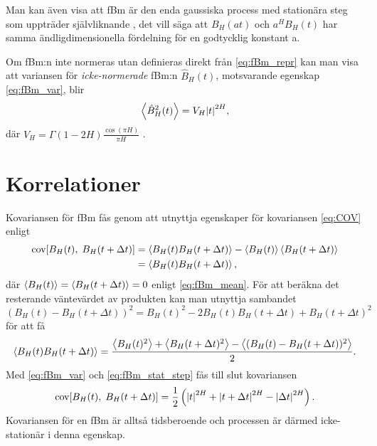 Man kan även visa att fBm är den enda gaussiska process med stationära steg som uppträder självliknande \cite{Dieker_fBm}, det vill säga att $B_H(at)$ och $a^H B_H(t)$ har samma ändligdimensionella fördelning för en godtycklig konstant a.

Om fBm:n inte normeras utan definieras direkt från \eqref{eq:fBm_repr} kan man visa att variansen för \emph{icke-normerade} fBm:n $\hat{B}_H(t)$, motsvarande egenskap \eqref{eq:fBm_var}, blir \cite{Dieker_fBm}
\begin{equation} \label{eq:fBm_onorm_var}
    \ev{\hat{B}^2_H(t)} = V_H \abs{t}^{2H},
\end{equation}
där $V_H = \Gamma(1-2H)\frac{\cos(\pi H)}{\pi H}$ \cite{Flandrin_fBmspektrum1989}.


\section{Korrelationer}
Kovariansen för fBm fås genom att utnyttja egenskaper för kovariansen \eqref{eq:COV} enligt
\begin{equation}
\begin{aligned}
    \COV{B_H(t)}{B_H(t+\Delta{t})}&=\ev{B_H(t)B_H(t+\Delta{t})}-\ev{B_H(t)}\ev{B_H(t+\Delta{t})}
    \\
    &=\ev{B_H(t)B_H(t+\Delta{t})},
\end{aligned}
\end{equation}
där $\ev{B_H(t)}=\ev{B_H(t+\Delta{t})}=0$ enligt \eqref{eq:fBm_mean}. För att beräkna det resterande väntevärdet av produkten kan man utnyttja sambandet $(B_H(t)-B_H(t+\Delta{t}))^2=B_H(t)^2 -2B_H(t)B_H(t+\Delta{t})+B_H(t+\Delta{t})^2$ för att få
\begin{equation}
    \ev{B_H(t)B_H(t+\Delta{t})}
    =\frac{
    \ev{B_H(t)^2} + \ev{B_H(t+\Delta{t})^2} - \ev{(B_H(t)-B_H(t+\Delta{t}))^2}
    }{2}.
\end{equation}
Med \eqref{eq:fBm_var} och \eqref{eq:fBm_stat_step} fås till slut kovariansen
\begin{equation} \label{eq:fBm_cov}
    \text{cov}\!\left[B_H(t),\;B_H(t+\Delta{t})\right] = \frac{1}{2}\left(\abs{t}^{2H}+\abs{t+\Delta t}^{2H}-\abs{\Delta{t}}^{2H}\right).
\end{equation}
Kovariansen för en fBm är alltså tidsberoende och processen är därmed icke-stationär i denna egenskap. 


